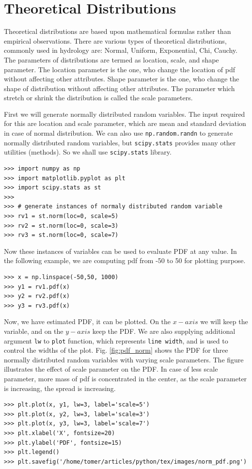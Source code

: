 \documentclass[10pt]{book}
\begin{document}
{\section{Theoretical Distributions}
Theoretical distributions are based upon mathematical formulas rather than empirical observations. There are various types of theoretical distributions, commonly used in hydrology are: Normal, Uniform, Exponential, Chi, Cauchy. The parameters of distributions are termed as location, scale, and shape parameter. The location parameter is the one, who change the location of pdf without affecting other attributes. Shape parameter is the one, who change the shape of distribution  without affecting other attributes. The parameter which stretch or shrink the distribution is called the scale parameters. 

First we will generate normally distributed random variables. The input required for this are location and scale parameter, which are mean and standard deviation in case of normal distribution. We can also use \verb"np.random.randn" to generate normally distributed random variables, but \verb"scipy.stats" provides many other utilities (methods). So we shall use \verb"scipy.stats" library. 

\beforeverb \begin{verbatim}
>>> import numpy as np
>>> import matplotlib.pyplot as plt
>>> import scipy.stats as st
>>> 
>>> # generate instances of normaly distributed random variable
>>> rv1 = st.norm(loc=0, scale=5)
>>> rv2 = st.norm(loc=0, scale=3)
>>> rv3 = st.norm(loc=0, scale=7)
\end{verbatim} \afterverb
{}
Now these instances of variables can be used to evaluate PDF at any value. In the following example, we are computing pdf from -50 to 50 for plotting purpose. 

\beforeverb \begin{verbatim}
>>> x = np.linspace(-50,50, 1000)
>>> y1 = rv1.pdf(x)
>>> y2 = rv2.pdf(x)
>>> y3 = rv3.pdf(x)
\end{verbatim} \afterverb

Now, we have estimated PDF, it can be plotted. On the $x-axis$ we will keep the variable, and on the $y-axis$ keep the PDF. We are also supplying additional argument \verb"lw" to \verb"plot" function, which represents \verb"line width", and is used to control the widths of the plot. Fig. \ref{fig:pdf_norm} shows the PDF for three normally distributed random variables with varying scale parameters. The figure illustrates the effect of scale parameter on the PDF. In case of less scale parameter, more mass of pdf is concentrated in the center, as the scale parameter is increasing, the spread is increasing. 
\beforeverb \begin{verbatim}
>>> plt.plot(x, y1, lw=3, label='scale=5')
>>> plt.plot(x, y2, lw=3, label='scale=3')
>>> plt.plot(x, y3, lw=3, label='scale=7')
>>> plt.xlabel('X', fontsize=20)
>>> plt.ylabel('PDF', fontsize=15)
>>> plt.legend()
>>> plt.savefig('/home/tomer/articles/python/tex/images/norm_pdf.png')
\end{verbatim} \afterverb

}
\end{document}
